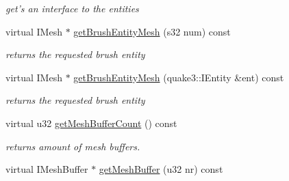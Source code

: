 \begin{DoxyCompactItemize}
\begin{DoxyCompactList}\small\item\em get's an interface to the entities \end{DoxyCompactList}\item 
\hypertarget{classirr_1_1scene_1_1_c_q3_level_mesh_a9c6fe5b8a55a9d7738d763adc1406abd}{virtual I\-Mesh $\ast$ \hyperlink{classirr_1_1scene_1_1_c_q3_level_mesh_a9c6fe5b8a55a9d7738d763adc1406abd}{get\-Brush\-Entity\-Mesh} (s32 num) const }\label{classirr_1_1scene_1_1_c_q3_level_mesh_a9c6fe5b8a55a9d7738d763adc1406abd}

\begin{DoxyCompactList}\small\item\em returns the requested brush entity \end{DoxyCompactList}\item 
\hypertarget{classirr_1_1scene_1_1_c_q3_level_mesh_ada645a6dfe104b6479d7589c6a3c7f33}{virtual I\-Mesh $\ast$ \hyperlink{classirr_1_1scene_1_1_c_q3_level_mesh_ada645a6dfe104b6479d7589c6a3c7f33}{get\-Brush\-Entity\-Mesh} (quake3\-::\-I\-Entity \&ent) const }\label{classirr_1_1scene_1_1_c_q3_level_mesh_ada645a6dfe104b6479d7589c6a3c7f33}

\begin{DoxyCompactList}\small\item\em returns the requested brush entity \end{DoxyCompactList}\item 
\hypertarget{classirr_1_1scene_1_1_c_q3_level_mesh_a43007337e5db1be0bf85ddc7fab1ff70}{virtual u32 \hyperlink{classirr_1_1scene_1_1_c_q3_level_mesh_a43007337e5db1be0bf85ddc7fab1ff70}{get\-Mesh\-Buffer\-Count} () const }\label{classirr_1_1scene_1_1_c_q3_level_mesh_a43007337e5db1be0bf85ddc7fab1ff70}

\begin{DoxyCompactList}\small\item\em returns amount of mesh buffers. \end{DoxyCompactList}\item 
\hypertarget{classirr_1_1scene_1_1_c_q3_level_mesh_ac77483956ab7ea0de086cb786e6a9944}{virtual I\-Mesh\-Buffer $\ast$ \hyperlink{classirr_1_1scene_1_1_c_q3_level_mesh_ac77483956ab7ea0de086cb786e6a9944}{get\-Mesh\-Buffer} (u32 nr) const }\label{classirr_1_1scene_1_1_c_q3_level_mesh_ac77483956ab7ea0de086cb786e6a9944}


\end{DoxyCompactItemize}
